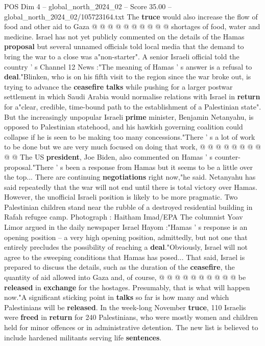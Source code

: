 \begin{textsample}{POS Dim 4 – global\_north\_2024\_02 – Score 35.00 – global\_north\_2024\_02/105723164.txt}
The \textbf{truce} would also increase the flow of food and other aid to Gaza @ @ @ @ @ @ @ @ @ @ shortages of food, water and medicine.
Israel has not yet publicly commented on the details of the Hamas \textbf{proposal} but several unnamed officials told local media that the demand to bring the war to a close was a"non-starter".
A senior Israeli official told the country ' s Channel 12 News :"The meaning of Hamas ' s answer is a refusal to \textbf{deal}."Blinken, who is on his fifth visit to the region since the war broke out, is trying to advance the \textbf{ceasefire} \textbf{talks} while pushing for a larger postwar settlement in which Saudi Arabia would normalise relations with Israel in \textbf{return} for a"clear, credible, time-bound path to the establishment of a Palestinian state".
But the increasingly unpopular Israeli \textbf{prime} minister, Benjamin Netanyahu, is opposed to Palestinian statehood, and his hawkish governing coalition could collapse if he is seen to be making too many concessions."There ' s a lot of work to be done but we are very much focused on doing that work, @ @ @ @ @ @ @ @ @ @ The US \textbf{president}, Joe Biden, also commented on Hamas ' s counter-proposal."There ' s been a response from Hamas but it seems to be a little over the top...
There are continuing \textbf{negotiations} right now,"he said.
Netanyahu has said repeatedly that the war will not end until there is total victory over Hamas.
However, the unofficial Israeli position is likely to be more pragmatic.
Two Palestinian children stand near the rubble of a destroyed residential building in Rafah refugee camp.
Photograph : Haitham Imad/EPA The columnist Yoav Limor argued in the daily newspaper Israel Hayom :"Hamas ' s response is an opening position -- a very high opening position, admittedly, but not one that entirely precludes the possibility of reaching a \textbf{deal}."Obviously, Israel will not agree to the sweeping conditions that Hamas has posed...
That said, Israel is prepared to discuss the details, such as the duration of the \textbf{ceasefire}, the quantity of aid allowed into Gaza and, of course, @ @ @ @ @ @ @ @ @ @ be \textbf{released} in \textbf{exchange} for the hostages.
Presumably, that is what will happen now."A significant sticking point in \textbf{talks} so far is how many and which Palestinians will be \textbf{released}.
In the week-long November \textbf{truce}, 110 Israelis were \textbf{freed} in \textbf{return} for 240 Palestinians, who were mostly women and children held for minor offences or in administrative detention.
The new list is believed to include hardened militants serving life \textbf{sentences}.

\end{textsample}
